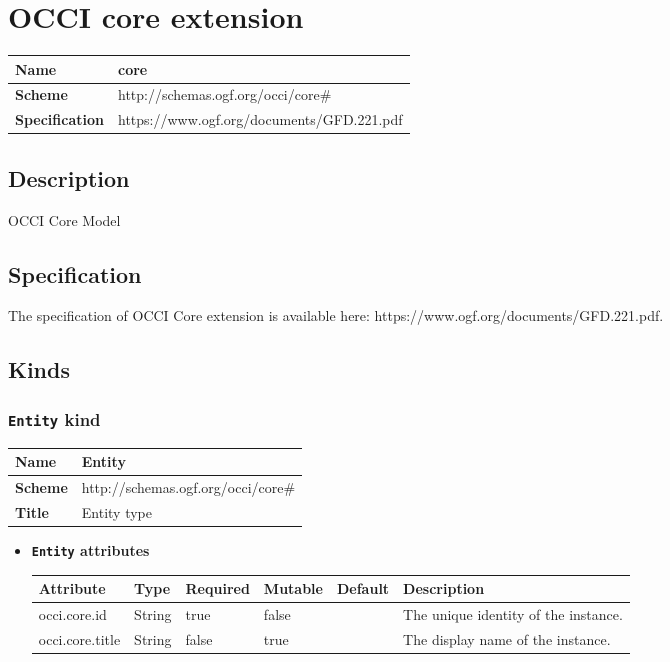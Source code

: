 \section{OCCI core extension}
\begin{center}
\begin{tabular}{|l|l|}
  \hline
  \textbf{Name} & core \\
  \hline  
  \textbf{Scheme} & http://schemas.ogf.org/occi/core\# \\
  \hline
  \textbf{Specification} & https://www.ogf.org/documents/GFD.221.pdf \\
  \hline
\end{tabular}
\end{center}

\subsection{Description}
OCCI Core Model


\subsection{Specification}
The specification of OCCI Core extension is available here: https://www.ogf.org/documents/GFD.221.pdf.
\subsection{Kinds}
\subsubsection{\texttt{Entity} kind}
\begin{center}
\begin{tabular}{|l|l|}
  \hline
  \textbf{Name} & Entity \\
  \hline  
  \textbf{Scheme} & http://schemas.ogf.org/occi/core\# \\
  \hline
  \textbf{Title} & Entity type \\
  \hline
\end{tabular}
\end{center}
\begin{itemize}
\item \textbf{\texttt{Entity} attributes}

\begin{tabularx}{\textwidth}{|l|l|p{1.4cm}|p{1.3cm}|l|X|}
  \hline
  \textbf{Attribute} & \textbf{Type} & \textbf{Required} & \textbf{Mutable} & \textbf{Default} & \textbf{Description} \\
  \hline  
  occi.core.id & String & true & false &  & The unique identity of the instance. \\
  \hline
  occi.core.title & String & false & true &  & The display name of the instance. \\
  \hline
\end{tabularx}
\end{itemize}


